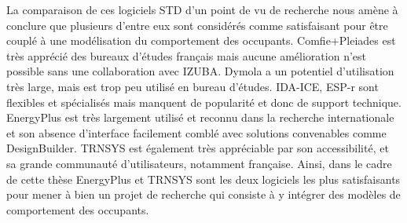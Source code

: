 La comparaison de ces logiciels STD d'un point de vu de recherche nous amène à conclure que plusieurs d'entre eux sont considérés comme satisfaisant pour être couplé à une modélisation du comportement des occupants. Comfie+Pleiades est très apprécié des bureaux d'études français mais aucune amélioration n'est possible sans une collaboration avec IZUBA. Dymola a un potentiel d'utilisation très large, mais est trop peu utilisé en bureau d'études. IDA-ICE, ESP-r sont flexibles et spécialisés mais manquent de popularité et donc de support technique. EnergyPlus est très largement utilisé et reconnu dans la recherche internationale et son absence d'interface facilement comblé avec solutions convenables comme DesignBuilder. TRNSYS est également très appréciable par son accessibilité, et sa grande communauté d'utilisateurs, notamment française. Ainsi, dans le cadre de cette thèse EnergyPlus et TRNSYS sont les deux logiciels les plus satisfaisants pour mener à bien un projet de recherche qui consiste à y intégrer des modèles de comportement des occupants.